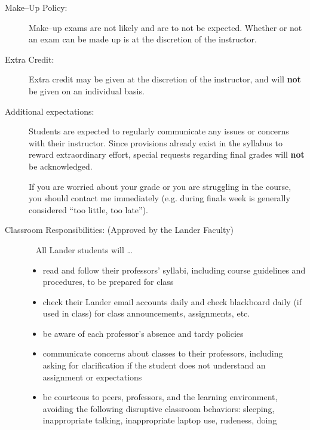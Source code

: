 \documentclass{article}
\begin{document}
  \begin{description}
\item[Make--Up Policy:] Make--up exams are not likely and are to not be expected. Whether or not an exam can be made up is at the discretion of the instructor.

\item[Extra Credit:] Extra credit may be given at the discretion of the instructor, and will \textbf{not} be given on an individual basis.

\item[Additional expectations:]
  Students are expected to regularly communicate any issues or concerns with their instructor. Since provisions already exist in the syllabus to reward extraordinary effort, special requests regarding final grades will \textbf{not} be acknowledged.

  If you are worried about your grade or you are struggling in the course, you should contact me immediately (e.g. during finals week is generally considered ``too little, too late'').

\item[Classroom Responsibilities: (Approved by the Lander Faculty)]\ \newline
  All Lander students will \dots
  \begin{itemize}
    \item read and follow their professors' syllabi, including course guidelines and procedures, to be prepared for class
    \item check their Lander email accounts daily and check blackboard daily (if used in class) for class announcements, assignments, etc.
    \item be aware of each professor’s absence and tardy policies
    \item communicate concerns about classes to their professors, including asking for clarification if the student does not understand an assignment or expectations
    \item be courteous to peers, professors, and the learning environment, avoiding the following disruptive classroom behaviors: sleeping, inappropriate talking, inappropriate laptop use, rudeness, doing homework for other classes, text messaging, or answering cell phones
    \item not give, use, or receive unauthorized aid in academic activities because these are serious violations of academic integrity
    \item know and accept the consequences of committing plagiarism, which could include receiving a failing assignment grade, failing the course, or being suspended from the University.
  \end{itemize}


\end{description}
\end{document}
